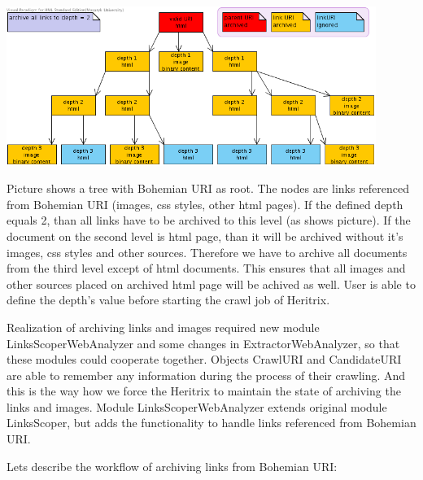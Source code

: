 \documentclass[11pt,a4paper]{article}
\begin{document}
\includegraphics[width=120mm]{depth.png}

Picture shows a tree with Bohemian URI as root. The nodes are links referenced from Bohemian URI (images, css styles, other html pages). If the defined depth equals 2, than all links have to be archived to this level (as shows picture). If the document on the second level is html page, than it will be archived without it's images, css styles and other sources. Therefore we have to archive all documents from the third level except of html documents. This ensures that all images and other sources placed on archived html page will be achived as well. User is able to define the depth's value before starting the crawl job of Heritrix.

Realization of archiving links and images required new module LinksScoperWebAnalyzer and some changes in ExtractorWebAnalyzer, so that these modules could cooperate together. Objects CrawlURI and CandidateURI are able to remember any information during the process of their crawling. And this is the way how we force the Heritrix to maintain the state of archiving the links and images. Module LinksScoperWebAnalyzer extends original module LinksScoper, but adds the functionality to handle links referenced from Bohemian URI.

Lets describe the workflow of archiving links from Bohemian URI:
\end{document}
